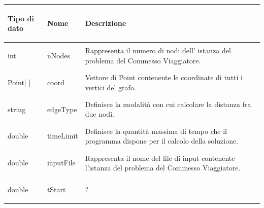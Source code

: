 \documentclass[11pt]{article}
\begin{document}
\begin{center}

    \begin{longtable}{ | p{4cm} | p{4cm} | p{7cm} |}
    \hline
    \begin{center} \textbf{Tipo di dato} \end{center} & \begin{center}  \textbf{Nome} \end{center}& 
    \begin{center} \textbf{Descrizione} \end{center}\\ \hline
    \begin{center} int \end{center} & \begin{center} nNodes \end{center}& \vfill Rappresenta il numero di nodi dell' istanza del problema del Commesso Viaggiatore.\vfill \\ \hline
    \begin{center} Point[ ] \end{center} & \begin{center} coord \end{center}& \vfill Vettore di Point contenente le coordinate di tutti i vertici del grafo.\vfill\\ \hline
    \begin{center} string \end{center} & \begin{center} edgeType \end{center}&\vfill Definisce la modalit\`a con cui calcolare la distanza fra due nodi.\vfill \\ \hline
    \begin{center} double \end{center} & \begin{center} timeLimit \end{center}& \vfill Definisce la quantit\`a massima di tempo che il programma dispone per il calcolo della soluzione.\vfill \\ \hline
    \begin{center} double \end{center} & \begin{center} inputFile \end{center}&\vfill Rappresenta il nome del file di input contenente l'istanza del problema del Commesso Viaggiatore. \vfill\\ \hline
    \begin{center} double \end{center} & \begin{center} tStart \end{center}& \vfill ? \vfill \\ \hline

\end{longtable}
\end{center}
\end{document}
